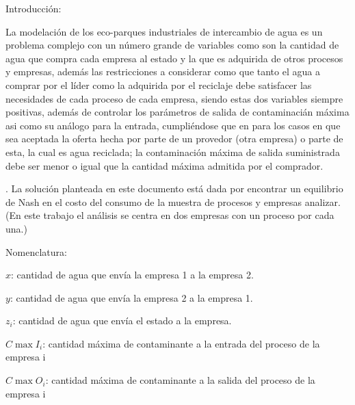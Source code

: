 \documentclass{article}
\begin{document}
\begin{center}
\vspace{1cm}
{\Large Introducci\'on:}
\end{center}

\vspace{0.5cm}
La modelaci\'on de los eco-parques industriales de
 intercambio de agua es un problema  complejo 
 con un n\'umero grande de  variables como son la cantidad de agua que compra cada empresa 
 al estado y la que es adquirida de otros procesos y empresas, adem\'as las  restricciones
  a considerar como que tanto el agua a comprar por el l\'ider como la adquirida por el reciclaje debe satisfacer las 
  necesidades de cada proceso de cada empresa, siendo estas dos variables siempre positivas, adem\'as de controlar los par\'ametros 
 de salida de contaminaci\'an m\'axima asi como su an\'alogo para la entrada, cumpli\'endose que en para los casos en que sea aceptada la oferta hecha por parte de un provedor (otra empresa) o parte de esta, la cual es agua reciclada;
 la contaminaci\'on m\'axima de salida suministrada debe ser menor o igual
 que la cantidad m\'axima admitida por el comprador. 

   . La soluci\'on planteada en este documento est\'a dada por encontrar
    un equilibrio de Nash en el costo del consumo de la muestra de procesos y empresas analizar.\\
    (En este trabajo el an\'alisis se centra en dos empresas con un proceso por cada una.)
\begin{center}
\newpage
\vspace{1cm}
{\Large Nomenclatura:}
\end{center}

\vspace{0.5cm}
{\large $ x $}: cantidad de agua que env\'ia la empresa 1 a la empresa 2.

\vspace{0.5cm}
{\large $ y $}: cantidad de agua que env\'ia la empresa 2 a la empresa 1.

\vspace{0.5cm}
{\large $ z_i $}: cantidad de agua que env\'ia el estado a la empresa. 

\vspace{0.5cm}
$ C\max{I_{i}} $: cantidad m\'axima de contaminante a la entrada del proceso de la empresa i

\vspace{0.5cm}
$ C\max{O_{i}} $: cantidad m\'axima de contaminante a la salida del proceso de la empresa i
\end{document}
